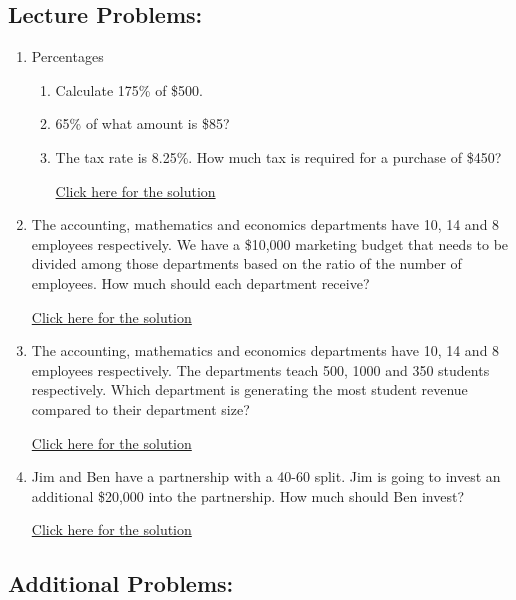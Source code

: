 \documentclass[
]{book}
\providecommand{\tightlist}{%
  \setlength{\itemsep}{0pt}\setlength{\parskip}{0pt}}
\begin{document}
\subsection*{Lecture Problems:}\label{lecture-problems-1}

\begin{enumerate}
\def\labelenumi{\arabic{enumi}.}
\tightlist
\item
  Percentages

  \begin{enumerate}
  \def\labelenumii{\alph{enumii}.}
  \tightlist
  \item
    Calculate 175\% of \$500.
  \item
    65\% of what amount is \$85?
  \item
    The tax rate is 8.25\%. How much tax is required for a purchase of \$450?

    \href{https://youtu.be/C5Ik5tzzrtE}{Click here for the solution}
  \end{enumerate}
\item
  The accounting, mathematics and economics departments have 10, 14 and 8 employees respectively. We have a \$10,000 marketing budget that needs to be divided among those departments based on the ratio of the number of employees. How much should each department receive?

  \href{https://youtu.be/2CGmE2oImEk}{Click here for the solution}
\item
  The accounting, mathematics and economics departments have 10, 14 and 8 employees respectively. The departments teach 500, 1000 and 350 students respectively. Which department is generating the most student revenue compared to their department size?

  \href{https://youtu.be/FLtoyc6iuGY}{Click here for the solution}
\item
  Jim and Ben have a partnership with a 40-60 split. Jim is going to invest an additional \$20,000 into the partnership. How much should Ben invest?

  \href{https://youtu.be/v_de0pgxKco}{Click here for the solution}
\end{enumerate}

\subsection*{Additional Problems:}\label{additional-problems-1}
\end{document}
